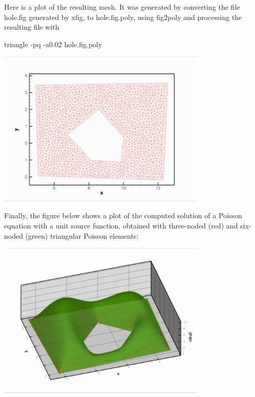 Here is a plot of the resulting mesh. It was generated by converting the file {\ttfamily hole.\+fig} generated by xfig, to {\ttfamily hole.\+fig.\+poly}, using {\ttfamily fig2poly} and processing the resulting file with


\begin{DoxyCode}
triangle -pq -a0.02 hole.fig.poly
\end{DoxyCode}


 
\begin{DoxyImage}
\includegraphics[width=0.75\textwidth]{hole_mesh}
\end{DoxyImage}


Finally, the figure below shows a plot of the computed solution of a Poisson equation with a unit source function, obtained with three-\/noded (red) and six-\/noded (green) triangular Poisson elements\+:

 
\begin{DoxyImage}
\includegraphics[width=0.75\textwidth]{hole_poisson}
\end{DoxyImage}


